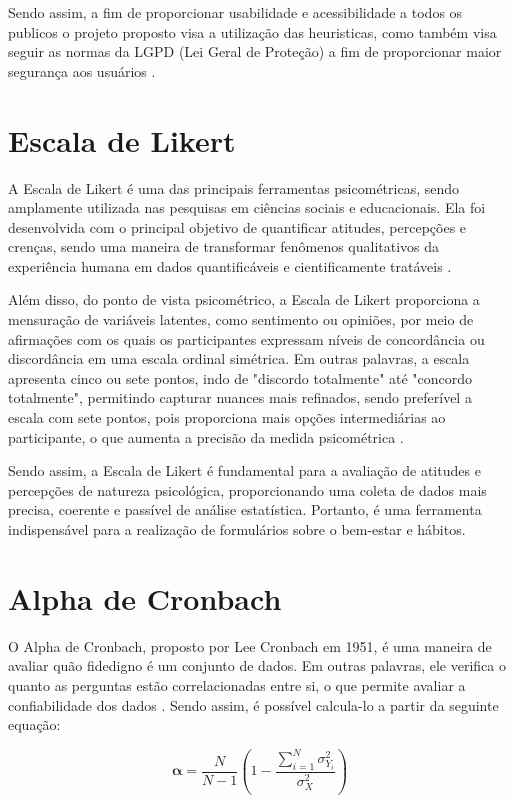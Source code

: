 Sendo assim, a fim de proporcionar usabilidade e acessibilidade a todos os publicos o projeto proposto visa a utilização das heuristicas, como também visa seguir as normas da LGPD (Lei Geral de Proteção) a fim de proporcionar maior segurança aos usuários \cite{brasil2018lgpd}.

\section{Escala de Likert}

A Escala de Likert é uma das principais ferramentas psicométricas, sendo amplamente utilizada nas pesquisas em ciências sociais e educacionais. Ela foi desenvolvida com o principal objetivo de quantificar atitudes, percepções e crenças, sendo uma maneira de transformar fenômenos qualitativos da experiência humana em dados quantificáveis e cientificamente tratáveis \cite{joshi_2015}.

Além disso, do ponto de vista psicométrico, a Escala de Likert proporciona a mensuração de variáveis latentes, como sentimento ou opiniões, por meio de afirmações com os quais os participantes expressam níveis de concordância ou discordância em uma escala ordinal simétrica. Em outras palavras, a escala apresenta cinco ou sete pontos, indo de "discordo totalmente" até "concordo totalmente", permitindo capturar nuances mais refinados, sendo preferível a escala com sete pontos, pois proporciona mais opções intermediárias ao participante, o que aumenta a precisão da medida psicométrica \cite{joshi_2015}.

Sendo assim, a Escala de Likert é fundamental para a avaliação de atitudes e percepções de natureza psicológica, proporcionando uma coleta de dados mais precisa, coerente e passível de análise estatística. Portanto, é uma ferramenta indispensável para a realização de formulários sobre o bem-estar e hábitos.

\section{Alpha de Cronbach}

O Alpha de Cronbach, proposto por Lee Cronbach em 1951, é uma maneira de avaliar quão fidedigno é um conjunto de dados. Em outras palavras, ele verifica o quanto as perguntas estão correlacionadas entre si, o que permite avaliar a confiabilidade dos dados \cite{cronbach_1951}. Sendo assim, é possível calcula-lo a partir da seguinte equação:

\begin{equation}
\label{eqn01}
    \mathbf{\alpha} = \frac{N}{N - 1} \left( 1 - \frac{\sum_{i=1}^{N} \sigma_{Y_i}^2}{\sigma_X^2} \right)
\end{equation}

